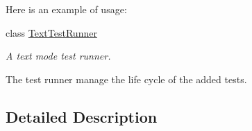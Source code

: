 \begin{DoxyCompactItemize}
\begin{DoxyCompactList}
Here is an example of usage\+: \end{DoxyCompactList}\item 
class \hyperlink{class_text_test_runner}{Text\+Test\+Runner}
\begin{DoxyCompactList}\small\item\em A text mode test runner.

The test runner manage the life cycle of the added tests. \end{DoxyCompactList}\end{DoxyCompactItemize}


\subsection{Detailed Description}
